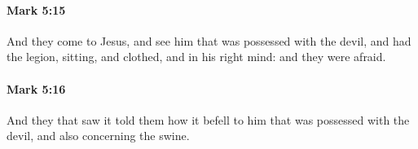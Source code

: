 		\paragraph{Mark 5:15} %
			\label{MARK-5-15}

			And they come to Jesus, and see him that was possessed with the devil, and had the legion, sitting, and clothed, and in his right mind: and they were afraid.

			\begin{framed}
			\scriptsize
				\begin{compactdesc}
					\item[SBLG] 
				\end{compactdesc}
			\end{framed}

		\paragraph{Mark 5:16} %
			\label{MARK-5-16}

			And they that saw it told them how it befell to him that was possessed with the devil, and also concerning the swine.

